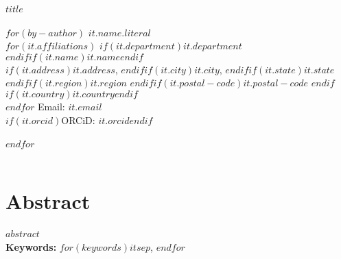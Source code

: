 \thispagestyle{empty}\noindent\textbf{$title$}\\%
\\%
$for(by-author)$
    \textbf{$it.name.literal$}\\%
    $for(it.affiliations)$
        $if(it.department)$$it.department$\\%
        $endif$$if(it.name)$$it.name$$endif$\\%
        $if(it.address)$$it.address$, $endif$$if(it.city)$$it.city$, $endif$$if(it.state)$$it.state$ $endif$$if(it.region)$$it.region$ $endif$$if(it.postal-code)$$it.postal-code$ $endif$$if(it.country)$$it.country$$endif$\\%
    $endfor$
    Email: \href{mailto:$it.email$}{$it.email$}\\%
    $if(it.orcid)$ORCiD: \href{https://orcid.org/$it.orcid$}{$it.orcid$}$endif$\\%
    \\%
$endfor$
\\%
\\%
\newpage

\section*{Abstract}

$abstract$~\\%
\textbf{Keywords:} $for(keywords)$$it$$sep$, $endfor$

\newpage